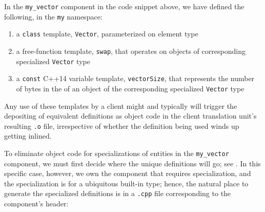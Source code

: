 \noindent In the \lstinline!my_vector! component in the code snippet above, we
have defined the following, in the \lstinline!my! namespace:
\begin{enumerate}
\item{a \lstinline!class! template, \lstinline!Vector!, parameterized on element type}
\item{a free-function template, \lstinline!swap!, that operates on objects of corresponding specialized \lstinline!Vector! type}
\item{a \lstinline!const! C++14 variable template,
\lstinline!vectorSize!, that represents the number of bytes in the  of an object of the corresponding specialized \lstinline!Vector! type}
\end{enumerate}
Any use of these templates by a client might and typically will trigger
the depositing of equivalent definitions as object code in the client
translation unit's resulting \lstinline!.o! file, irrespective of whether
the definition being used winds up getting inlined.

To eliminate object code for specializations of entities in the
\lstinline!my_vector! component, we must first decide where the unique
definitions will go; see . In this
specific case, however, we own the component that requires
specialization, and the specialization is for a ubiquitous built-in type;
hence, the natural place to generate the specialized definitions is in a
\lstinline!.cpp! file corresponding to the component's header:


